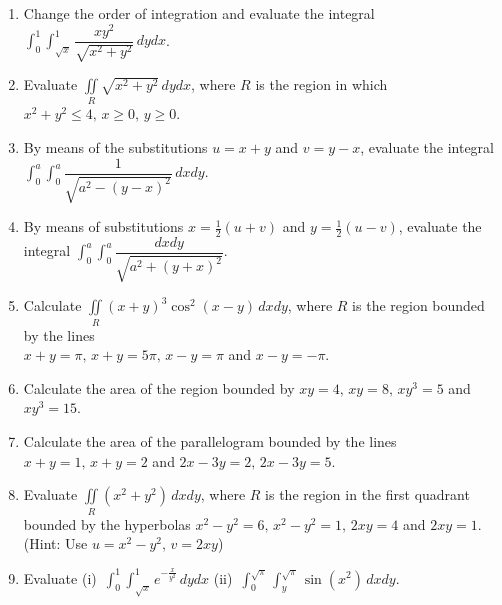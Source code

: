 \documentclass[titlepage,a4paper,12pt]{report}
\begin{document}
\begin{enumerate}
\item Change the order of integration and evaluate the integral $\displaystyle \int _0^1 \int _{\sqrt{x}}^1 \dfrac{xy^2}{\sqrt{x^2+y^2}}\, dydx$.
\item Evaluate $\displaystyle \iint \limits _{R}\sqrt{x^2+y^2}\, dydx$, where $R$ is the region in which $x^2+y^2\leq 4, \, x\geq 0, \, y\geq 0$.
\item By means of the substitutions $u=x+y$ and $v=y-x$, evaluate the integral $\displaystyle \int _0^a\int _0^a \dfrac{1}{\sqrt{a^2-(y-x)^2}}\, dxdy$.
\item By means of substitutions $x=\frac{1}{2}(u+v)$ and $y=\frac{1}{2}(u-v)$, evaluate the integral $\displaystyle \int _0^a\int _0^a \dfrac{dxdy}{\sqrt{a^2+(y+x)^2}}$.
\item Calculate $\displaystyle \iint \limits _{R}(x+y)^3\cos ^2 (x-y)\, dxdy$, where $R$ is the region bounded by the lines\\ $x+y=\pi, \, x+y=5\pi, \, x-y=\pi$ and $x-y=-\pi$.
\item Calculate the area of the region bounded by $xy=4, \, xy=8, \, xy^3=5$ and $xy^3=15$.
\item Calculate the area of the parallelogram bounded by the lines $x+y=1, \, x+y=2$ and $2x-3y=2, \, 2x-3y=5$.
\item Evaluate $\displaystyle \iint \limits _{R} (x^2+y^2)\, dxdy$, where $R$ is the region in the first quadrant  bounded by the hyperbolas $x^2-y^2=6, \, x^2-y^2=1, \, 2xy=4 $ and $2xy=1$. (Hint: Use $u=x^2-y^2, \, v=2xy$)
\item Evaluate (i)\, $\displaystyle \int _0^1 \int _{\sqrt{x}}^1 e^{-\frac{x}{y^2}}\, dydx$ \quad (ii)\, $\displaystyle \int _0^{\sqrt{\pi}}\int _y^{\sqrt{\pi}} \sin (x^2) \, dxdy$.
\end{enumerate}
\end{document}
